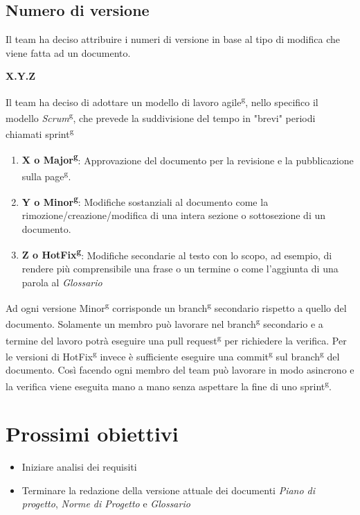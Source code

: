     \subsection{Numero di versione}
        Il team ha deciso attribuire i numeri di versione in base al tipo di modifica che viene fatta ad un documento.
        \begin{center}
            \textbf{X.Y.Z}
        \end{center}
        Il team ha deciso di adottare un modello di lavoro agile\textsuperscript{g}, nello specifico il modello \textit{Scrum}\textsuperscript{g}, che prevede la suddivisione del tempo in "brevi" periodi chiamati sprint\textsuperscript{g}
        \begin{enumerate}
            \item \textbf{X o Major\textsuperscript{g}}: Approvazione del documento per la revisione e la pubblicazione sulla page\textsuperscript{g}.
            \item \textbf{Y o Minor\textsuperscript{g}}: Modifiche sostanziali al documento come la rimozione/creazione/modifica di una intera sezione o sottosezione di un documento.
            \item \textbf{Z o HotFix\textsuperscript{g}}: Modifiche secondarie al testo con lo scopo, ad esempio, di rendere più comprensibile una frase o un termine o come l'aggiunta di una parola al \textit{Glossario}
        \end{enumerate}
        Ad ogni versione Minor\textsuperscript{g} corrisponde un branch\textsuperscript{g} secondario rispetto a quello del documento. Solamente un membro può lavorare nel branch\textsuperscript{g} secondario e a termine del lavoro 
        potrà eseguire una pull request\textsuperscript{g} per richiedere la verifica. Per le versioni di HotFix\textsuperscript{g} invece è sufficiente eseguire una commit\textsuperscript{g} sul branch\textsuperscript{g} del documento.
        Così facendo ogni membro del team può lavorare in modo asincrono e la verifica viene eseguita mano a mano senza aspettare la fine di uno sprint\textsuperscript{g}.
\section{Prossimi obiettivi}
   \begin{itemize}
        \item Iniziare analisi dei requisiti
        \item Terminare la redazione della versione attuale dei documenti \textit{Piano di progetto}, \textit{Norme di Progetto} e \textit{Glossario}
    \end{itemize}
